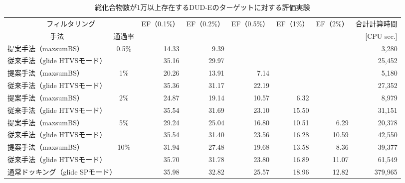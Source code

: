 \begin{landscape}
\begin{table}[p] \centering
	\caption{総化合物数が1万以上存在するDUD-Eのターゲットに対する評価実験}
	\label{table:usecase_accuracy}
	\begin{tabular}{lc|rrrrr|r}
	\hline
	\multicolumn{2}{c|}{フィルタリング}					&\multirow{2}{*}{EF（0.1\%）}	&\multirow{2}{*}{EF（0.2\%）}	&\multirow{2}{*}{EF（0.5\%）}	&\multirow{2}{*}{EF（1\%）}	&\multirow{2}{*}{EF（2\%）}	&合計計算時間	\\
	\multicolumn{1}{c}{手法}	&通過率					&						&						&						&						&						&[CPU sec.]		\\ \hline
	提案手法（maxsumBS）		&\multirow{2}{*}{0.5\%}	&14.33					&9.39					&\textendash				&\textendash				&\textendash				&3,280			\\
	従来手法（glide HTVSモード）	&					&35.16					&29.97					&\textendash				&\textendash				&\textendash				&25,452			\\
	提案手法（maxsumBS）		&\multirow{2}{*}{1\%}	&20.26					&13.91					&7.14					&\textendash				&\textendash				&5,180			\\
	従来手法（glide HTVSモード）	&					&35.36					&31.17					&22.19					&\textendash				&\textendash				&27,352			\\
	提案手法（maxsumBS）		&\multirow{2}{*}{2\%}	&24.87					&19.14					&10.57					&6.32					&\textendash				&8,979			\\
	従来手法（glide HTVSモード）	&					&35.54					&31.69					&23.10					&15.50					&\textendash				&31,151			\\
	提案手法（maxsumBS）		&\multirow{2}{*}{5\%}	&29.24					&25.04					&16.80					&10.51					&6.29					&20,378			\\
	従来手法（glide HTVSモード）	&					&35.54					&31.40					&23.56					&16.28					&10.59					&42,550			\\
	提案手法（maxsumBS）		&\multirow{2}{*}{10\%}	&31.94					&27.48					&19.68					&13.58					&8.36					&39,377			\\
	従来手法（glide HTVSモード）	&					&35.70					&31.78					&23.80					&16.89					&11.07					&61,549			\\ \hline
	\multicolumn{2}{l|}{通常ドッキング（glide SPモード）}	&35.98					&32.82					&25.57					&18.96					&12.82					&379,965			\\ \hline
	\end{tabular}
\end{table}
\end{landscape}

